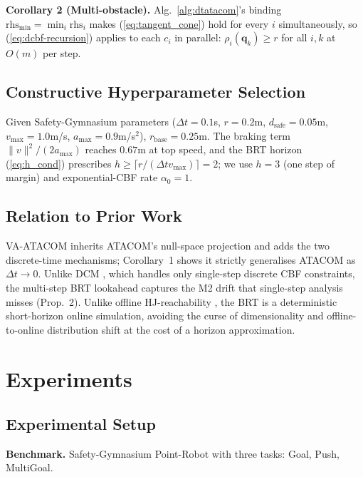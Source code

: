 \documentclass[letterpaper]{article}
\begin{document}
\textbf{Corollary 2 (Multi-obstacle).} Alg.~\ref{alg:dtatacom}'s binding $\text{rhs}_{\min} = \min_i \text{rhs}_i$ makes (\ref{eq:tangent_cone}) hold for every $i$ simultaneously, so (\ref{eq:dcbf-recursion}) applies to each $c_i$ in parallel: $\rho_i(\boldsymbol q_k) \ge r$ for all $i,k$ at $O(m)$ per step.

\subsection{Constructive Hyperparameter Selection}

Given Safety-Gymnasium parameters ($\Delta t = 0.1$s, $r = 0.2$m, $d_\text{safe} = 0.05$m, $v_{\max} = 1.0$m/s, $a_{\max}=0.9$m/s$^2$), $r_\text{base} = 0.25$m. The braking term $\|v\|^2/(2a_{\max})$ reaches $0.67$m at top speed, and the BRT horizon (\ref{eq:h_cond}) prescribes $h \ge \lceil r/(\Delta t v_{\max})\rceil = 2$; we use $h=3$ (one step of margin) and exponential-CBF rate $\alpha_0=1$.

\subsection{Relation to Prior Work}

VA-ATACOM inherits ATACOM's null-space projection and adds the two discrete-time mechanisms; Corollary~1 shows it strictly generalises ATACOM as $\Delta t \to 0$. Unlike DCM \cite{agrawal2017}, which handles only single-step discrete CBF constraints, the multi-step BRT lookahead captures the M2 drift that single-step analysis misses (Prop.~2). Unlike offline HJ-reachability \cite{mitchell2005,bansal2017,fisac2019,hsu2021}, the BRT is a deterministic short-horizon online simulation, avoiding the curse of dimensionality and offline-to-online distribution shift at the cost of a horizon approximation.

\section{Experiments}
\label{sec:experiments}

\subsection{Experimental Setup}
\label{sec:setup}

\textbf{Benchmark.} Safety-Gymnasium Point-Robot with three tasks: Goal, Push, MultiGoal.
\end{document}
